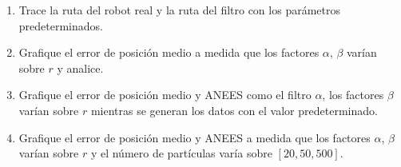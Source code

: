 \documentclass[tp]{lcc}
\begin{document}
\begin{enumerate}
	\item Trace la ruta del robot real y la ruta del filtro con los parámetros predeterminados.
	\item Grafique el error de posición medio a medida que los factores $\alpha$, $\beta$ varían sobre $r$ y analice.
	\item Grafique el error de posición medio y ANEES como el filtro $\alpha$, los factores $\beta$ varían sobre $r$ mientras se generan los datos
	con el valor predeterminado.
	\item Grafique el error de posición medio y ANEES a medida que los factores $\alpha$, $\beta$ varían sobre $r$ y el número de partículas varía
	sobre $[20, 50, 500]$.
\end{enumerate}


\printbibliography
	
\end{document}
